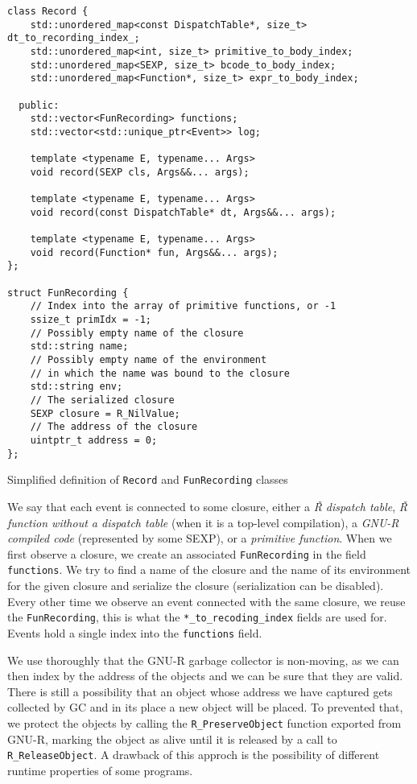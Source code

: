 \begin{listing}
	\begin{verbatim}
class Record {
    std::unordered_map<const DispatchTable*, size_t> dt_to_recording_index_;
    std::unordered_map<int, size_t> primitive_to_body_index;
    std::unordered_map<SEXP, size_t> bcode_to_body_index;
    std::unordered_map<Function*, size_t> expr_to_body_index;

  public:
    std::vector<FunRecording> functions;
    std::vector<std::unique_ptr<Event>> log;

    template <typename E, typename... Args>
    void record(SEXP cls, Args&&... args);

    template <typename E, typename... Args>
    void record(const DispatchTable* dt, Args&&... args);

    template <typename E, typename... Args>
    void record(Function* fun, Args&&... args);
};

struct FunRecording {
    // Index into the array of primitive functions, or -1
    ssize_t primIdx = -1;
    // Possibly empty name of the closure
    std::string name;
    // Possibly empty name of the environment
    // in which the name was bound to the closure
    std::string env;
    // The serialized closure
    SEXP closure = R_NilValue;
    // The address of the closure
    uintptr_t address = 0;
};
  \end{verbatim}
	\caption{Simplified definition of \texttt{Record} and \texttt{FunRecording} classes }\label{lst:record-class}
\end{listing}

We say that each event is connected to some closure, either a \textit{Ř dispatch table}, \textit{Ř function without a dispatch table} (when it is a top-level compilation), a \textit{GNU-R compiled code} (represented by some SEXP), or a \textit{primitive function}. When we first observe a closure, we create an associated \texttt{FunRecording} in the field \texttt{functions}. We try to find a name of the closure and the name of its environment for the given closure and serialize the closure (serialization can be disabled). Every other time we observe an event connected with the same closure, we reuse the \texttt{FunRecording}, this is what the \texttt{*\_to\_recoding\_index} fields are used for. Events hold a single index into the \texttt{functions} field.

We use thoroughly that the GNU-R garbage collector is non-moving, as we can then index by the address of the objects and we can be sure that they are valid. There is still a possibility that an object whose address we have captured gets collected by GC and in its place a new object will be placed. To prevented that, we protect the objects by calling the \texttt{R\_PreserveObject} function exported from GNU-R, marking the object as alive until it is released by a call to \texttt{R\_ReleaseObject}. A drawback of this approch is the possibility of different runtime properties of some programs.

